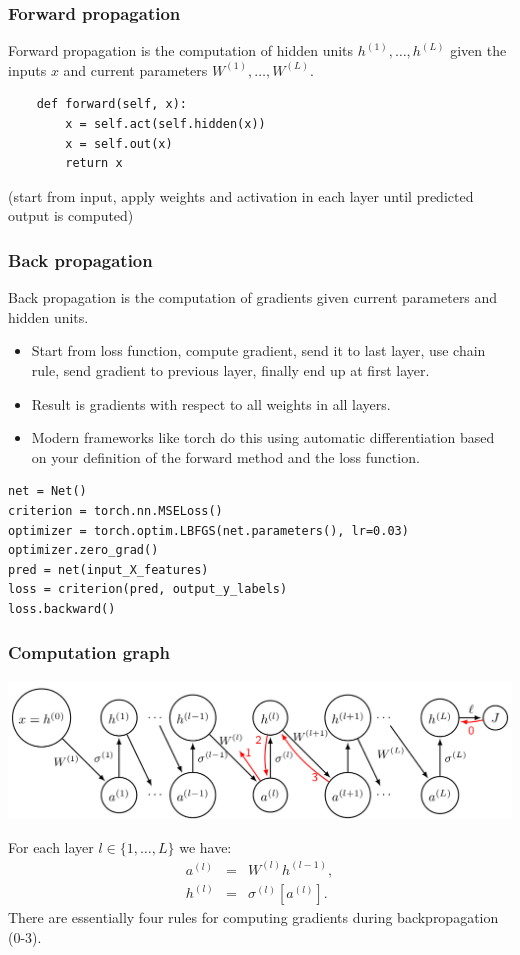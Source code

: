 \documentclass{beamer}
\begin{document}
\begin{frame}[fragile]
  \frametitle{Forward propagation}
Forward propagation is the computation of hidden units
$h^{(1)},\dots,h^{(L)}$ given the inputs $x$ and current parameters
$W^{(1)},\dots,W^{(L)}$.
\begin{verbatim}
    def forward(self, x):
        x = self.act(self.hidden(x))
        x = self.out(x)
        return x
\end{verbatim}
(start from input, apply weights and activation in each layer until
predicted output is computed)
\end{frame}

\begin{frame}[fragile]
  \frametitle{Back propagation}
Back propagation is the computation of gradients given current
parameters and hidden units.
\begin{itemize}
\item Start from loss function, compute gradient, send it to last
  layer, use chain rule, send gradient to previous layer, finally end
  up at first layer.
\item Result is gradients with respect to all weights in all layers.
\item Modern frameworks like torch do this using automatic
  differentiation based on your definition of the forward method and
  the loss function.
\end{itemize}

\begin{verbatim}
net = Net()
criterion = torch.nn.MSELoss()
optimizer = torch.optim.LBFGS(net.parameters(), lr=0.03)
optimizer.zero_grad()
pred = net(input_X_features)
loss = criterion(pred, output_y_labels)
loss.backward()
\end{verbatim}

\end{frame}

\begin{frame}
  \frametitle{Computation graph}
  \includegraphics[width=\textwidth]{screenshot-backprop-figure}

For
each layer $l\in \{1, \dots, L\}$ we have:
\begin{eqnarray*}
  a^{(l)} &=&  W^{(l)} h^{(l-1)}, \\
  h^{(l)} &=& \sigma^{(l)}\left[ a^{(l)} \right].
\end{eqnarray*}
There are essentially four rules for computing gradients during
backpropagation (0-3).
  
\end{frame}
\end{document}
